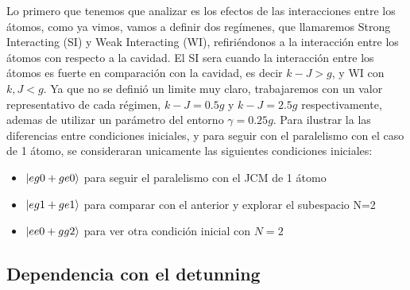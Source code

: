 Lo primero que tenemos que analizar es los efectos de las interacciones entre los átomos, como ya vimos,  vamos a definir dos regímenes, que llamaremos Strong Interacting (SI) y Weak Interacting (WI), refiriéndonos a la interacción entre los átomos con respecto a la cavidad. El SI sera cuando la interacción entre los átomos es fuerte en comparación con la cavidad, es decir $k-J>g$, y WI con $k,J<g$. Ya que no se definió un limite muy claro, trabajaremos con un valor representativo de cada régimen, $k-J=0.5g$ y $k-J=2.5g$ respectivamente, ademas de utilizar un parámetro del entorno $\gamma=0.25g$. Para ilustrar la las diferencias entre condiciones iniciales, y para seguir con el paralelismo con el caso de 1 átomo, se consideraran unicamente las siguientes condiciones iniciales:
\begin{itemize}
    \item $\ket{eg0+ge0}$ para seguir el paralelismo con el JCM de 1 átomo 
    \item $\ket{eg1+ge1}$ para comparar con el anterior y explorar el subespacio N=2
    \item $\ket{ee0+gg2}$ para ver otra condición inicial con $N=2$ 
\end{itemize}
\subsection{Dependencia con el detunning}
